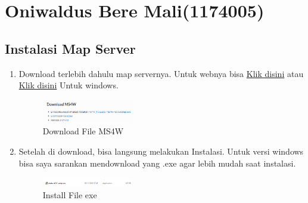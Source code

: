 \section{Oniwaldus Bere Mali(1174005)}
\subsection{Instalasi Map Server}
\begin{enumerate}
    \item Download terlebih dahulu map servernya. Untuk webnya bisa \href{https://mapserver.org/}{Klik disini} atau \href{https://ms4w.com/}{Klik disini} Untuk windows.
    \hfill\break
    \begin{figure}[H]
		\includegraphics[width=4cm]{figures/1174005/4/01.png}
		\centering
		\caption{Download File MS4W}
    \end{figure}
    \hfill\break

    \item Setelah di download, bisa langsung melakukan Instalasi. Untuk versi windows bisa saya sarankan mendownload yang .exe agar lebih mudah saat instalasi.
    \hfill\break
    \begin{figure}[H]
		\includegraphics[width=4cm]{figures/1174005/4/02.png}
		\centering
		\caption{Install File exe}
    \end{figure}
    \hfill\break

\end{enumerate}


